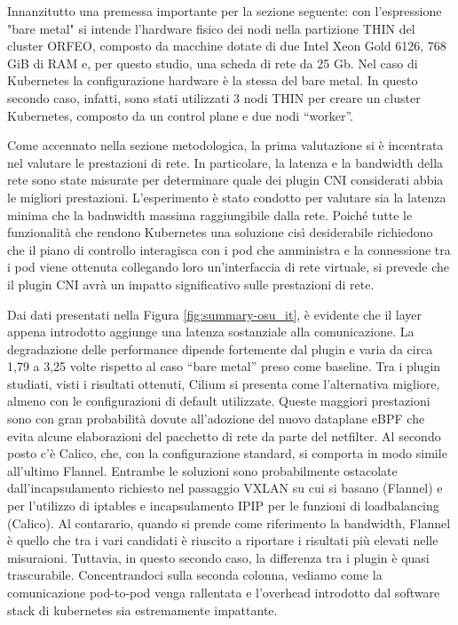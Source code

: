Innanzitutto una premessa importante per la sezione seguente: con l'espressione
"bare metal" si intende l'hardware fisico dei nodi nella partizione THIN del
cluster ORFEO, composto da macchine dotate di due Intel Xeon Gold 6126, 768 GiB
di RAM e, per questo studio, una scheda di rete da 25 Gb. Nel caso di Kubernetes
la configurazione hardware è la stessa del bare metal.
In questo secondo caso, infatti, sono stati utilizzati 3 nodi THIN per creare un
cluster Kubernetes, composto da un control plane e due nodi ``worker''.

Come accennato nella sezione metodologica, la prima valutazione si è incentrata
nel valutare le prestazioni di rete.
In particolare, la latenza e la bandwidth della rete sono state misurate per
determinare quale dei plugin CNI considerati abbia le migliori prestazioni.
L'esperimento è stato condotto per valutare sia la latenza minima che la
badnwidth massima raggiungibile dalla rete.
Poiché tutte le funzionalità che rendono Kubernetes una soluzione cisì
desiderabile richiedono che il piano di controllo interagisca con i pod che
amministra e la connessione tra i pod viene ottenuta collegando loro
un'interfaccia di rete virtuale, si prevede che il plugin CNI avrà un impatto
significativo sulle prestazioni di rete.

Dai dati presentati nella Figura \ref{fig:summary-osu_it}, è evidente che il
layer appena introdotto aggiunge una latenza sostanziale alla comunicazione.
La degradazione delle performance dipende fortemente dal plugin e varia da circa
1,79 a 3,25 volte rispetto al caso ``bare metal'' preso come baseline.
Tra i plugin studiati, visti i risultati ottenuti, Cilium si presenta come
l'alternativa migliore, almeno con le configurazioni di default utilizzate.
Queste maggiori prestazioni sono con gran probabilità dovute all'adozione del
nuovo dataplane eBPF che evita alcune elaborazioni del pacchetto di rete da
parte del netfilter.
 Al secondo posto c'è Calico, che, con la configurazione standard,
si comporta in modo simile all'ultimo Flannel.
Entrambe le soluzioni sono probabilmente ostacolate dall'incapsulamento richiesto nel
passaggio VXLAN su cui si basano (Flannel) e per l'utilizzo di iptables e
incapsulamento IPIP per le funzioni di loadbalancing (Calico).
Al contarario, quando si prende come riferimento la bandwidth, Flannel è quello
che tra i vari candidati è riuscito a riportare i risultati più elevati nelle
misuraioni.
Tuttavia, in questo secondo caso, la differenza tra i plugin è
quasi trascurabile.
Concentrandoci sulla seconda colonna, vediamo come la comunicazione pod-to-pod
venga rallentata e l'overhead introdotto dal software stack di kubernetes sia
estremamente impattante.

